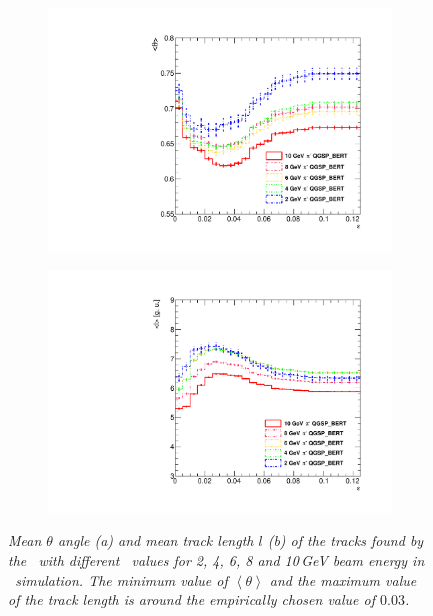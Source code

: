 \begin{appendices}
	\begin{figure}[H]
		\centering
		\begin{subfigure}{0.5\textwidth}
			\centering
			\includegraphics[width=.90\linewidth]{ECAL/plots/sys-theta.pdf}
			\caption{\label{fig:thetaepsilonsys} }
		\end{subfigure}%
		\begin{subfigure}{0.5\textwidth}
			\centering
			\includegraphics[width=.90\linewidth]{ECAL/plots/sys-l.pdf}
			\caption{\label{fig:lepsilonsys} }
		\end{subfigure}
		\caption{\label{fig:syslthetaexample} \sl Mean $\theta$ angle (a) and mean track length $l$ (b) of the tracks found by the \tfa\ with different \ep\ values for 2, 4, 6, 8 and 10\,GeV beam energy in \qgsp\ simulation. The minimum value of $\left<\theta\right>$ and the maximum value of the track length is around the empirically chosen value of $0.03$. }
	\end{figure}
	\newpage
\end{appendices}
